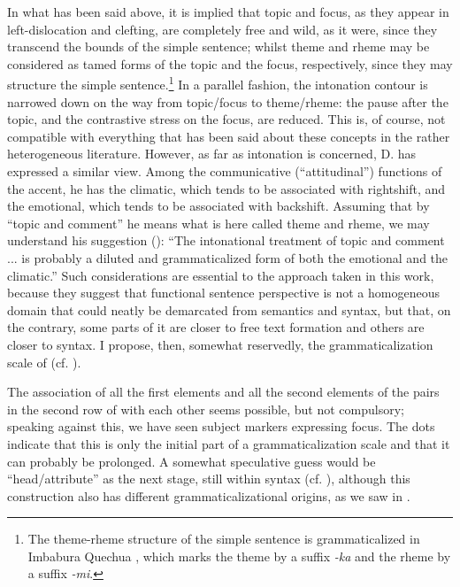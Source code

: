 In what has been said above, it is implied that topic and focus, as they appear in left-dislocation and clefting, are completely free and wild, as it were, since they transcend the bounds of the simple sentence; whilst theme and rheme may be considered as tamed forms of the topic and the focus, respectively, since they may structure the simple sentence.\footnote{The theme-rheme structure of the simple sentence is grammaticalized in Imbabura Quechua \citep[95--98]{Cole1982}, which marks the theme by a suffix \textit{{}-ka} and the rheme by a suffix \textit{{}-mi}.} In a parallel fashion, the intonation contour is narrowed down on the way from topic/focus to theme/rheme: the pause after the topic, and the contrastive stress on the focus, are reduced. This is, of course, not compatible with everything that has been said about these concepts in the rather heterogeneous literature. However, as far as intonation is concerned, D. \citet{Bolinger1978} has expressed a similar view. Among the communicative (“attitudinal”) functions of the accent, he has the climatic, which tends to be associated with rightshift, and the emotional, which tends to be associated with backshift. Assuming that by ``topic and comment'' he means what is here called theme and rheme, we may understand his suggestion (\citeyear[489]{Bolinger1978}): “The intonational treatment of topic and comment ... is probably a diluted and grammaticalized form of both the emotional and the climatic.” Such considerations are essential to the approach taken in this work, because they suggest that functional sentence perspective is not a homogeneous domain that could neatly be demarcated from semantics and syntax, but that, on the contrary, some parts of it are closer to free text formation and others are closer to syntax. I propose, then, somewhat reservedly, the grammaticalization scale of  (cf. ).

The association of all the first elements and all the second elements of the pairs in the second row of  with each other seems possible, but not compulsory; speaking against this, we have seen subject markers expressing focus. The dots indicate that this is only the initial part of a grammaticalization scale and that it can probably be prolonged. A somewhat speculative guess would be ``head/attribute'' as the next stage, still within syntax (cf. \citealt[Ch.~\textsc{iv}.2]{Lehmann1984}), although this construction also has different grammaticalizational origins, as we saw in .

